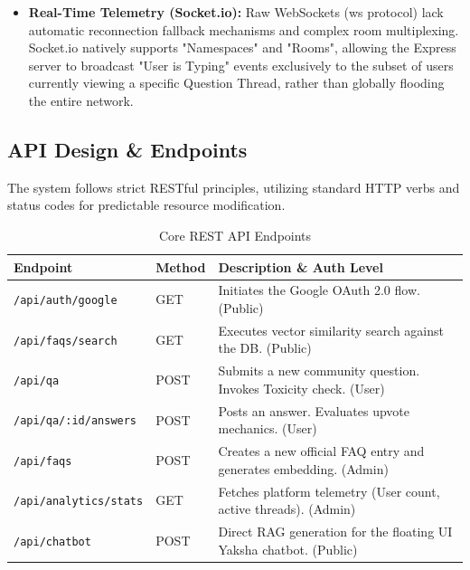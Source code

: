 \documentclass[12pt,a4paper]{article}
\begin{document}
\begin{itemize}
    \item \textbf{Real-Time Telemetry (Socket.io):} Raw WebSockets (ws protocol) lack automatic reconnection fallback mechanisms and complex room multiplexing. Socket.io natively supports "Namespaces" and "Rooms", allowing the Express server to broadcast "User is Typing" events exclusively to the subset of users currently viewing a specific Question Thread, rather than globally flooding the entire network.
\end{itemize}

\subsection{API Design \& Endpoints}
The system follows strict RESTful principles, utilizing standard HTTP verbs and status codes for predictable resource modification.

\vspace{0.5cm}
\begin{table}[h]
\centering
\renewcommand{\arraystretch}{1.5}
\begin{tabularx}{\textwidth}{@{} l l X @{}}
\toprule
\textbf{Endpoint} & \textbf{Method} & \textbf{Description \& Auth Level} \\
\midrule
\texttt{/api/auth/google} & GET & Initiates the Google OAuth 2.0 flow. (Public) \\
\texttt{/api/faqs/search} & GET & Executes vector similarity search against the DB. (Public) \\
\texttt{/api/qa} & POST & Submits a new community question. Invokes Toxicity check. (User) \\
\texttt{/api/qa/:id/answers} & POST & Posts an answer. Evaluates upvote mechanics. (User) \\
\texttt{/api/faqs} & POST & Creates a new official FAQ entry and generates embedding. (Admin) \\
\texttt{/api/analytics/stats} & GET & Fetches platform telemetry (User count, active threads). (Admin) \\
\texttt{/api/chatbot} & POST & Direct RAG generation for the floating UI Yaksha chatbot. (Public) \\
\bottomrule
\end{tabularx}
\caption{Core REST API Endpoints}
\end{table}
\end{document}
